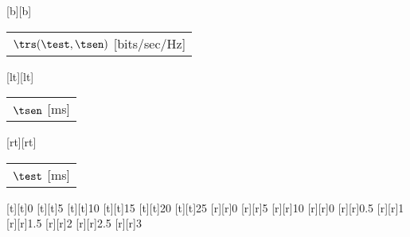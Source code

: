 %    
%
%
%
[b][b]{\fontsize{8}{12}\selectfont \color[rgb]{0,0,0}\setlength{\tabcolsep}{0pt}\begin{tabular}{c}$\trs(\test,\tsen)$ [bits/sec/Hz]\end{tabular}}%
[lt][lt]{\fontsize{8}{12}\selectfont \color[rgb]{0,0,0}\setlength{\tabcolsep}{0pt}\begin{tabular}{l}$\tsen$ [ms]\end{tabular}}%
[rt][rt]{\fontsize{8}{12}\selectfont \color[rgb]{0,0,0}\setlength{\tabcolsep}{0pt}\begin{tabular}{r}$\test$ [ms]\end{tabular}}%
%
\fontsize{8}{12}%
\selectfont%
%
[t][t]{0}%
[t][t]{5}%
[t][t]{10}%
[t][t]{15}%
[t][t]{20}%
[t][t]{25}%
%
[r][r]{0}%
[r][r]{5}%
[r][r]{10}%
%
[r][r]{0}%
[r][r]{0.5}%
[r][r]{1}%
[r][r]{1.5}%
[r][r]{2}%
[r][r]{2.5}%
[r][r]{3}%
%
%
